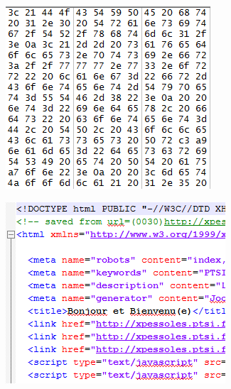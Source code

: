 \documentclass[10pt,fleqn]{article} %
\begin{document}
\begin{minipage}[c]{.32\linewidth}
\begin{center}
\includegraphics[width=.9\textwidth]{images/image4_2.png}

\vspace{1cm}
 
\includegraphics[width=.9\textwidth]{images/image5_2.png}
\end{center}
\end{minipage}
\end{document}
